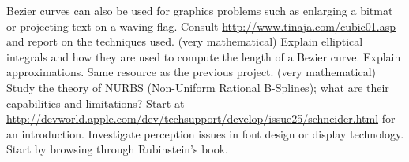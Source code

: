 \project Bezier curves can also be used for graphics problems such as
enlarging a bitmat or projecting text on a waving flag. Consult
\url{http://www.tinaja.com/cubic01.asp} and report on the techniques
used.
%
\project (very mathematical) Explain elliptical integrals and how they
are used to compute the length of a Bezier curve. Explain
approximations. Same resource as the previous project.
%
\project (very mathematical) Study the theory of NURBS (Non-Uniform
Rational B-Splines); what are their capabilities and limitations?
Start at
\url{http://devworld.apple.com/dev/techsupport/develop/issue25/schneider.html}
for an introduction.
%
\project Investigate perception issues in font design or
  display technology. Start by browsing through Rubinstein's book.
